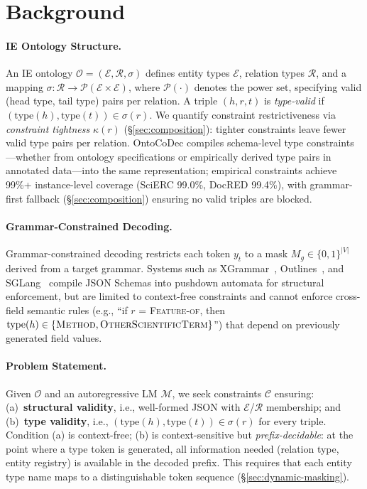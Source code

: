 
\section{Background}
\label{sec:background}

\paragraph{IE Ontology Structure.}
\label{sec:bg:ontology}
An IE ontology $\mathcal{O} = (\mathcal{E}, \mathcal{R}, \sigma)$ defines entity types $\mathcal{E}$, relation types $\mathcal{R}$, and a mapping $\sigma: \mathcal{R} \to \mathcal{P}(\mathcal{E} \times \mathcal{E})$, where $\mathcal{P}(\cdot)$ denotes the power set, specifying valid (head type, tail type) pairs per relation.
A triple $(h, r, t)$ is \emph{type-valid} if $(\mathrm{type}(h), \mathrm{type}(t)) \in \sigma(r)$.
We quantify constraint restrictiveness via \emph{constraint tightness} $\kappa(r)$ (\S\ref{sec:composition}): tighter constraints leave fewer valid type pairs per relation.
OntoCoDec compiles schema-level type constraints---whether from ontology specifications or empirically derived type pairs in annotated data---into the same representation; empirical constraints achieve 99\%+ instance-level coverage (SciERC 99.0\%, DocRED 99.4\%), with grammar-first fallback (\S\ref{sec:composition}) ensuring no valid triples are blocked.

\paragraph{Grammar-Constrained Decoding.}
\label{sec:bg:gcd}
Grammar-constrained decoding restricts each token $y_t$ to a mask $M_g \in \{0, 1\}^{|V|}$ derived from a target grammar.
Systems such as XGrammar~\citep{dong2025xgrammar}, Outlines~\citep{willard2023outlines}, and SGLang~\citep{zheng2024sglang} compile JSON Schemas into pushdown automata for structural enforcement, but are limited to context-free constraints and cannot enforce cross-field semantic rules (e.g., ``if $r$ = \textsc{Feature-of}, then $\mathrm{type}(h) \in \{\textsc{Method}, \textsc{OtherScientificTerm}\}$'') that depend on previously generated field values.

\paragraph{Problem Statement.}
\label{sec:bg:problem}
Given $\mathcal{O}$ and an autoregressive LM $\mathcal{M}$, we seek constraints $\mathcal{C}$ ensuring: (a)~\textbf{structural validity}, i.e., well-formed JSON with $\mathcal{E}$/$\mathcal{R}$ membership; and (b)~\textbf{type validity}, i.e., $(\mathrm{type}(h), \mathrm{type}(t)) \in \sigma(r)$ for every triple.
Condition (a) is context-free; (b) is context-sensitive but \emph{prefix-decidable}: at the point where a type token is generated, all information needed (relation type, entity registry) is available in the decoded prefix.
This requires that each entity type name maps to a distinguishable token sequence (\S\ref{sec:dynamic-masking}).
